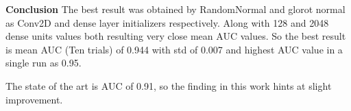\textbf{Conclusion}
The best result was obtained by RandomNormal and glorot normal as Conv2D and dense layer initializers respectively. Along with 128 and 2048 dense units values both resulting very close mean AUC values. So the best
result is mean AUC (Ten trials) of 0.944 with std of 0.007 and highest AUC value in a single run as 0.95. 

The state of the art is AUC of 0.91, so the finding in this work hints at slight improvement.

